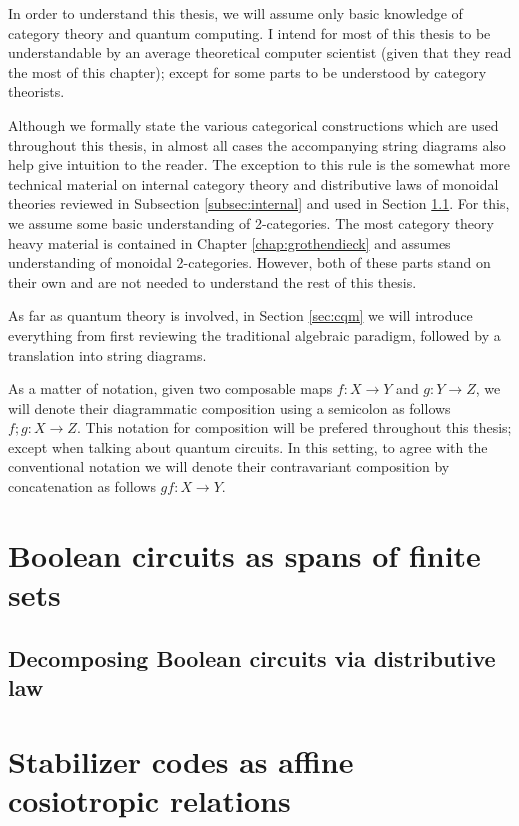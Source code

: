 \documentclass[12pt]{ociamthesis}  %
\begin{document}
\label{chap:background}
In order to understand this thesis, we will assume only basic knowledge of category theory and quantum computing.  I intend for most of this thesis to be understandable by an average theoretical computer scientist  (given that they read the most of this chapter); except for some parts to be understood by category theorists.


Although we formally state the various categorical constructions which are used throughout this thesis, in almost all cases the accompanying string diagrams also help give intuition to the reader.  The exception to this rule is the somewhat more technical  material on internal category theory and distributive laws of monoidal theories reviewed in Subsection \ref{subsec:internal} and used in Section \ref{sec:dist}.  For this, we assume some basic understanding of 2-categories.  The most category theory heavy material is contained in Chapter \ref{chap:grothendieck} and assumes understanding of monoidal 2-categories.  However, both of these parts stand on their own and are not needed to understand the rest of this thesis.

As far as quantum theory is involved, in Section \ref{sec:cqm} we will introduce everything from first reviewing the traditional algebraic paradigm, followed by a translation into string diagrams.

As a matter of notation, given two composable maps $f:X\to Y$ and $g:Y \to Z$, we will denote their diagrammatic composition using a semicolon as follows $f;g:X\to Z$. This notation for composition will be prefered throughout this thesis; except when talking about quantum circuits.  In this setting, to agree with the conventional notation we will denote their contravariant composition by concatenation as follows $gf:X\to Y$.





\chapter{Boolean circuits as spans of finite sets}
\label{chap:zxa}


\section{Decomposing Boolean circuits via distributive law}
\label{sec:dist}


\chapter{Stabilizer codes as affine cosiotropic relations}
\label{chap:stab}

\end{document}
